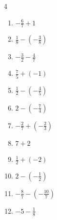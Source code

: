 \begin{multicols}{4}
\begin{enumerate}
  \item $\displaystyle -\frac{6}{7} + 1$


  \item $\displaystyle \frac{1}{8} - \left(-\frac{3}{8}\right)$


  \item $\displaystyle -\frac{3}{2} - \frac{4}{7}$


  \item $\displaystyle \frac{7}{5} + \left(-1\right)$


  \item $\displaystyle \frac{1}{2} - \left(-\frac{4}{5}\right)$


  \item $\displaystyle 2 - \left(-\frac{7}{4}\right)$


  \item $\displaystyle -\frac{2}{7} + \left(-\frac{2}{3}\right)$


\columnbreak %

  \item $\displaystyle 7 + 2$

        \phantom{$\displaystyle =9$}

  \item $\displaystyle \frac{1}{2} + \left(-2\right)$


  \item $\displaystyle 2 - \left(-\frac{1}{2}\right)$


  \item $\displaystyle -\frac{8}{7} - \left(-\frac{10}{7}\right)$


  \item $\displaystyle -5 - \frac{1}{8}$


\end{enumerate}
\end{multicols}
